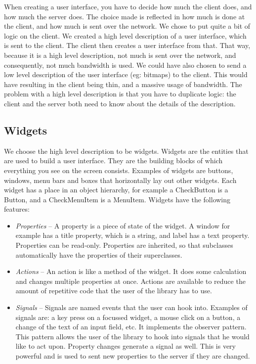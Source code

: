 \documentclass[11pt]{article}
\begin{document}
When creating a user interface, you have to decide how much the client does, and how much the server does.
The choice made is reflected in how much is done at the client, and how much is sent over the network.
We chose to put quite a bit of logic on the client.
We created a high level description of a user interface, which is sent to the client.
The client then creates a user interface from that.
That way, because it is a high level description, not much is sent over the network, and consequently, not much bandwidth is used.
We could have also chosen to send a low level description of the user interface (eg: bitmaps) to the client.
This would have resulting in the client being thin, and a massive usage of bandwidth.
The problem with a high level description is that you have to duplicate logic: the client and the server both need to know about the details of the description.

\subsection{Widgets}

We choose the high level description to be widgets.
Widgets are the entities that are used to build a user interface.
They are the building blocks of which everything you see on the screen consists.
Examples of widgets are buttons, windows, menu bars and boxes that horizontally lay out other widgets.
Each widget has a place in an object hierarchy, for example a CheckButton is a Button, and a CheckMenuItem is a MenuItem.
Widgets have the following features:

\begin{itemize}
\item \textit{Properties} -- A property is a piece of state of the widget.
A window for example has a title property, which is a string, and label has a text property.
Properties can be read-only.
Properties are inherited, so that subclasses automatically have the properties of their superclasses.

\item \textit{Actions} -- An action is like a method of the widget.
It does some calculation and changes multiple properties at once.
Actions are available to reduce the amount of repetitive code that the user of the library has to use.

\item \textit{Signals} -- Signals are named events that the user can hook into.
Examples of signals are: a key press on a focussed widget, a mouse click on a button, a change of the text of an input field, etc.
It implements the observer pattern.
This pattern allows the user of the library to hook into signals that he would like to act upon.
Property changes generate a signal as well.
This is very powerful and is used to sent new properties to the server if they are changed.
\end{itemize}
\end{document}
